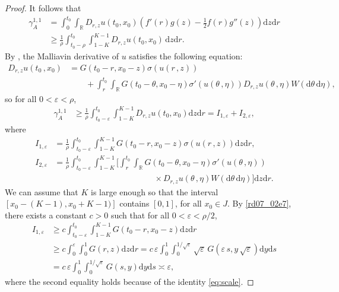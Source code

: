 \documentclass[12pt,a4paper]{article}
\newcommand{\R}{{\mathbb{R}}}
\renewcommand{\d}{\mathrm{d}}
\newcommand {\ep}{{\varepsilon}}
\newcommand{\<}{\langle}
\renewcommand{\>}{\rangle}
\begin{document}
\begin{proof}
It follows that
\begin{align*}
         \gamma_A^{1,1}&= \int_0^{t_0}\int_\R D_{r,z} u(t_0,x_0) \left( f'(r) g(z)- \frac 12f(r) g''(z)\right) \d z \d r\\
         &\geq  \frac1\rho \int_{t_0-\rho}^{t_0}\int_{1-K}^{K-1} D_{r,z} u(t_0,x_0)\, \d z\d r. 
\end{align*}
By \cite[Proposition 2.4.4]{nualart2006},  the Malliavin derivative of $u$ satisfies  the following equation:
\begin{align*}
         D_{r,z}u(t_0\,,x_0)&= G(t_0-r, x_0-z)\sigma(u(r\,,z))\\
          &\qquad + \int_r^{t_0}\int_\R G(t_0-\theta, x_0-\eta)\sigma'(u(\theta\,, \eta))
         D_{r,z}u(\theta\,, \eta)W(\d\theta\, \d \eta),
 \end{align*}
so for all $0<\varepsilon<\rho$,
\begin{align}\label{gamma11-1}
         \gamma_A^{1,1}& \geq \frac1 \rho \int_{t_0-\varepsilon}^{t_0}\int_{1-K}^{K-1} D_{r,z} u(t_0,x_0)\d z\d r = I_{1, \varepsilon} + I_{2, \varepsilon},
\end{align}
where
\begin{align*}
        I_{1, \varepsilon} &= \frac1\rho \int_{t_0-\varepsilon}^{t_0}\int_{1-K}^{K-1} G(t_0-r, x_0-z)\sigma(u(r\,,z))\d z\d r , \\
     I_{2, \varepsilon}   &= \frac1\rho \int_{t_0-\varepsilon}^{t_0}\int_{1-K}^{K-1}\Bigg[\int_r^{t_0}\int_\R G(t_0-\theta, x_0-\eta)\sigma'(u(\theta\,, \eta)) \\
      &\qquad\qquad\qquad\qquad\qquad\qquad
       \times  D_{r,z}u(\theta\,, \eta)W(\d\theta\, \d \eta)\Bigg]\d z\d r.
\end{align*}
We can assume that $K$ is large enough so that the interval $[x_0-(K-1), x_0+ K -1)]$ contains $[0, 1]$, for all $x_0\in J$.  By \eqref{rd07_02e7}, there exists a constant $c>0$ such that for all $0<\varepsilon<\rho/2$,
\begin{align}\label{I1}
         I_{1, \varepsilon} &\geq c \int_{t_0-\varepsilon}^{t_0}\int_{1-K}^{K-1} G(t_0-r, x_0-z)\d z \d r \nonumber\\
         &\geq c \int_0^{\varepsilon} \int_0^1G(r, z) \d z \d r = c\, \varepsilon \int_0^{1} \int_0^{1/\sqrt{\varepsilon}}
           \sqrt{\ep}\, G(\varepsilon\, s, y\, \sqrt{\varepsilon})\d y\d s\nonumber\\
         &= c\, \varepsilon  \int_0^{1} \int_0^{1/\sqrt{\varepsilon}}
         G(s, y)\d y\d s \asymp \varepsilon,
\end{align}
where the second equality holds because of the identity \eqref{eq:scale}.
         

\end{proof}
\end{document}
